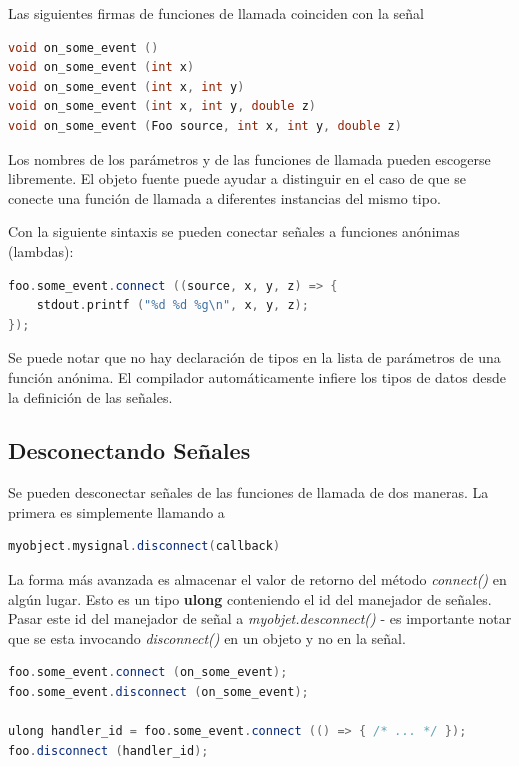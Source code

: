\documentclass[12pt,twoside]{book}
\begin{document}
Las siguientes firmas de funciones de llamada coinciden con la señal
\begin{lstlisting}[language=C++]
void on_some_event ()
void on_some_event (int x)
void on_some_event (int x, int y)
void on_some_event (int x, int y, double z)
void on_some_event (Foo source, int x, int y, double z)
\end{lstlisting}

Los nombres de los parámetros y de las funciones de llamada pueden escogerse libremente. El objeto fuente puede ayudar a distinguir en el caso de que se conecte una función de llamada a diferentes instancias del mismo tipo. 

Con la siguiente sintaxis se pueden conectar señales a funciones anónimas (lambdas):

\begin{lstlisting}[language=C++]
foo.some_event.connect ((source, x, y, z) => {
	stdout.printf ("%d %d %g\n", x, y, z);
});
\end{lstlisting}

Se puede notar que no hay declaración de tipos en la lista de parámetros de una función anónima. El compilador automáticamente infiere los tipos de datos desde la definición de las señales.

\subsection{Desconectando Señales}

Se pueden desconectar señales de las funciones de llamada de dos maneras. La primera es simplemente llamando a

\begin{lstlisting}[language=C++]
myobject.mysignal.disconnect(callback)
\end{lstlisting}

La forma más avanzada es almacenar el valor de retorno del método \textit{connect()} en algún lugar. Esto es un tipo \textbf{ulong} conteniendo el id del manejador de señales. Pasar este id del manejador de señal a \textit{myobjet.desconnect()} - es importante notar que se esta invocando \textit{disconnect()} en un objeto y no en la señal. 

\begin{lstlisting}[language=C++]
foo.some_event.connect (on_some_event);
foo.some_event.disconnect (on_some_event);

ulong handler_id = foo.some_event.connect (() => { /* ... */ });
foo.disconnect (handler_id);
\end{lstlisting}
\end{document}

